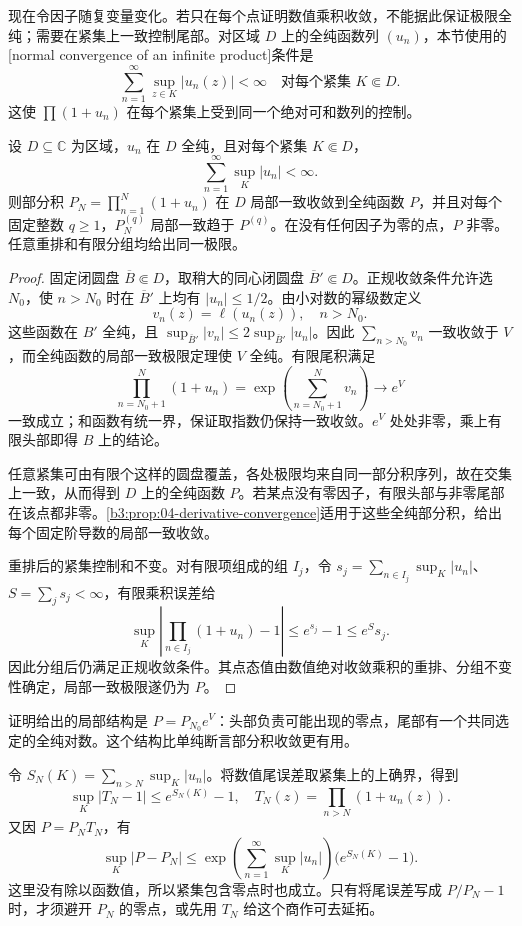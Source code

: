 现在令因子随复变量变化。若只在每个点证明数值乘积收敛，不能据此保证极限全纯；需要在紧集上一致控制尾部。对区域 \(D\) 上的全纯函数列 \((u_n)\)，本节使用的[normal convergence of an infinite product]条件是
\[
 \sum_{n=1}^{\infty}\sup_{z\in K}|u_n(z)|<\infty
 \quad\text{对每个紧集 }K\Subset D.
\]
这使 \(\prod(1+u_n)\) 在每个紧集上受到同一个绝对可和数列的控制。

\begin{proposition}[正规全纯乘积]\label{b3:prop:20-normal-product}
设 \(D\subseteq\mathbb C\) 为区域，\(u_n\) 在 \(D\) 全纯，且对每个紧集 \(K\Subset D\)，
\[
 \sum_{n=1}^{\infty}\sup_K|u_n|<\infty.
\]
则部分积 \(P_N=\prod_{n=1}^N(1+u_n)\) 在 \(D\) 局部一致收敛到全纯函数 \(P\)，并且对每个固定整数 \(q\ge1\)，\(P_N^{(q)}\) 局部一致趋于 \(P^{(q)}\)。在没有任何因子为零的点，\(P\) 非零。任意重排和有限分组均给出同一极限。
\end{proposition}
\begin{proof}
固定闭圆盘 \(\overline B\Subset D\)，取稍大的同心闭圆盘 \(\overline B'\Subset D\)。正规收敛条件允许选 \(N_0\)，使 \(n>N_0\) 时在 \(\overline B'\) 上均有 \(|u_n|\le1/2\)。由小对数的幂级数定义
\[
 v_n(z)=\ell(u_n(z)),\quad n>N_0.
\]
这些函数在 \(B'\) 全纯，且 \(\sup_{\overline B'}|v_n|\le2\sup_{\overline B'}|u_n|\)。因此 \(\sum_{n>N_0}v_n\) 一致收敛于 \(V\)，而全纯函数的局部一致极限定理使 \(V\) 全纯。有限尾积满足
\[
 \prod_{n=N_0+1}^{N}(1+u_n)
 =\exp\left(\sum_{n=N_0+1}^{N}v_n\right)
 \longrightarrow e^V
\]
一致成立；和函数有统一界，保证取指数仍保持一致收敛。\(e^V\) 处处非零，乘上有限头部即得 \(B\) 上的结论。

任意紧集可由有限个这样的圆盘覆盖，各处极限均来自同一部分积序列，故在交集上一致，从而得到 \(D\) 上的全纯函数 \(P\)。若某点没有零因子，有限头部与非零尾部在该点都非零。\cref{b3:prop:04-derivative-convergence}适用于这些全纯部分积，给出每个固定阶导数的局部一致收敛。

重排后的紧集控制和不变。对有限项组成的组 \(I_j\)，令 \(s_j=\sum_{n\in I_j}\sup_K|u_n|\)、\(S=\sum_j s_j<\infty\)，有限乘积误差给
\[
 \sup_K\left|\prod_{n\in I_j}(1+u_n)-1\right|
 \le e^{s_j}-1\le e^S s_j.
\]
因此分组后仍满足正规收敛条件。其点态值由数值绝对收敛乘积的重排、分组不变性确定，局部一致极限遂仍为 \(P\)。
\end{proof}
证明给出的局部结构是 \(P=P_{N_0}e^V\)：头部负责可能出现的零点，尾部有一个共同选定的全纯对数。这个结构比单纯断言部分积收敛更有用。

\ProseParagraphBreak

令 \(S_N(K)=\sum_{n>N}\sup_K|u_n|\)。将数值尾误差取紧集上的上确界，得到
\[
 \sup_K|T_N-1|\le e^{S_N(K)}-1,
 \quad T_N(z)=\prod_{n>N}(1+u_n(z)).
\]
又因 \(P=P_NT_N\)，有
\[
 \sup_K|P-P_N|
 \le\exp\left(\sum_{n=1}^{\infty}\sup_K|u_n|\right)
       \bigl(e^{S_N(K)}-1\bigr).
\]
这里没有除以函数值，所以紧集包含零点时也成立。只有将尾误差写成 \(P/P_N-1\) 时，才须避开 \(P_N\) 的零点，或先用 \(T_N\) 给这个商作可去延拓。

